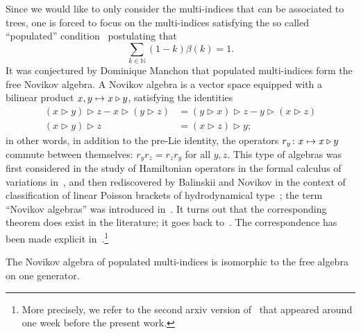 \documentclass[AHL,Unicode,longabstracts]{cedram}
\newcommand{\bbN}{\mathbb{N}}
\let\oldmapsto\mapsto
\renewcommand*{\mapsto}{\mathchoice{\longmapsto}{\oldmapsto}{\oldmapsto}{\oldmapsto}}
\begin{document}
Since we would like to only consider the multi-indices that can be associated to trees, one is forced to focus on the multi-indices satisfying the so called ``populated'' condition~\cite{LOT} postulating that
\begin{equation}\label{populated_1}
\sum_{k \in \bbN} (1 - k)\beta(k) = 1.
\end{equation}
It was conjectured by Dominique Manchon that populated multi-indices form the free Novikov algebra. A Novikov algebra is a vector space equipped with a bilinear product $x,y\mapsto x\triangleright y$, satisfying the identities
\begin{align}
(x \triangleright y) \triangleright z - x \triangleright (y \triangleright z) &= (y \triangleright x) \triangleright z - y \triangleright (x \triangleright z)
\\ (x \triangleright y) \triangleright z &= (x \triangleright z)\triangleright y ;
\end{align}
in other words, in addition to the pre-Lie identity, the operators $r_y\colon x\mapsto x\triangleright y$ commute between themselves: $r_yr_z=r_zr_y$ for all $y,z$. This type of algebras was first considered in the study of Hamiltonian operators in the formal calculus of variations in~\cite{GD}, and then rediscovered by Balinskii and Novikov in the context of classification of linear Poisson brackets of hydrodynamical type~\cite{BN85}; the term ``Novikov algebras'' was introduced in~\cite{O92}. It turns out that the corresponding theorem does exist in the literature; it goes back to~\cite{DL}. The correspondence has been made explicit in~\cite[Lemma~3.5]{Li23}.\footnote{More precisely, we refer to the second arxiv version of~\cite{Li23} that appeared around one week before the present work.}

\begin{theo}[{\cite[Lemma~3.5]{Li23}}]
\label{free_Novikov}
The Novikov algebra of populated multi-indices is isomorphic to the free algebra on one generator.
\end{theo}
\end{document}
